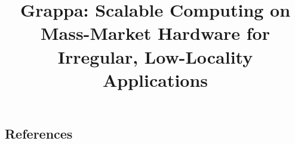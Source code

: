 



\title{Grappa: Scalable Computing on Mass-Market Hardware for Irregular, Low-Locality Applications}

\maketitle
\begin{abstract}

\end{abstract}



















\subsection{References}





